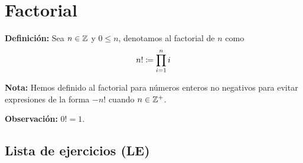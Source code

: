 \pagebreak

\section*{Factorial}

\textbf{Definición:} Sea $n\in \mathbb{Z}$ y $0\leq n$, denotamos al factorial de $n$ como \[n!\coloneqq \prod_{i=1}^{n}i\]

\textbf{Nota:} Hemos definido al factorial para números enteros no negativos para evitar expresiones de la forma $-n!$ cuando $n\in \mathbb{Z}^+$.

\textbf{Observación:} $0!=1$.

\subsection*{Lista de ejercicios (LE)}


